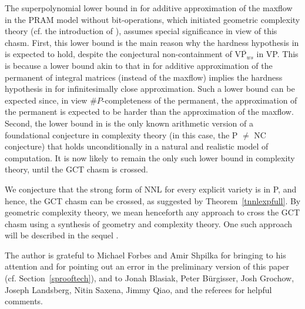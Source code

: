 \documentclass[11pt]{article}
\begin{document}
The superpolynomial lower bound in  \cite{GCTmaxflow}
for  additive approximation of 
the maxflow 
in the PRAM model without bit-operations,
which initiated geometric complexity theory (cf. the introduction of \cite{GCT1}), 
assumes special significance in view of this  chasm.
First, this lower bound is the main reason why the hardness hypothesis  
in  \cite{GCT1} is expected to hold, 
despite the conjectural non-containment of  $\overline{\mbox{VP}_{ws}}$ in VP. 
This is because  a lower bound akin to that in \cite{GCTmaxflow} 
for  additive approximation of the permanent of 
integral matrices (instead of the maxflow) implies  the  hardness hypothesis in \cite{GCT1}
for infinitesimally close approximation. Such a lower bound 
can be  expected since, in view $\#P$-completeness  \cite{valiant} of the permanent, the 
approximation of the permanent is expected to be harder than the approximation of
the maxflow.
Second, the lower bound in \cite{GCTmaxflow} is 
the only known arithmetic version of a foundational  conjecture
in complexity theory (in this case, the P $\not =$ NC conjecture) that holds unconditionally
in a natural and realistic model of computation. 
It is now likely to remain the only such lower bound in complexity theory, 
until the GCT chasm is crossed.

We conjecture that the strong form of 
NNL for every  explicit variety is in P, and hence, the GCT  chasm  can  be crossed, 
as suggested by Theorem~\ref{tnnlexpfull}.
By geometric complexity theory, we mean henceforth any approach to cross the GCT chasm using a synthesis of geometry and
complexity theory. One such   approach  will be described in the sequel \cite{GCT6}.






%

The author is grateful to Michael Forbes and Amir Shpilka   for bringing 
\cite{manindra,amir}
to his attention and for pointing out \cite{fs3} an error in the preliminary version \cite{GCT5focs} of this paper (cf. 
Section~\ref{sprooftech}), and to Jonah Blasiak,  Peter B\"urgisser, Josh Grochow, 
Joseph Landsberg, Nitin Saxena, Jimmy Qiao, and the referees   for helpful comments.

%
%



\end{document}
